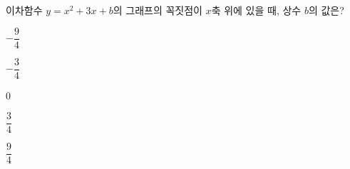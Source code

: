 이차함수 $y=x^2+3x+b$의 그래프의 꼭짓점이 $x$축 위에 있을 때, 상수 $b$의 값은?
\begin{choices32}{\rule[-3ex]{0pt}{8ex}$-\dfrac{9}{4}$}{\rule[-3ex]{0pt}{8ex}$-\dfrac{3}{4}$}{\rule[-3ex]{0pt}{8ex}$0$}{\rule[-3ex]{0pt}{8ex}$\dfrac{3}{4}$}{\rule[-3ex]{0pt}{8ex}$\dfrac{9}{4}$}\end{choices32}
